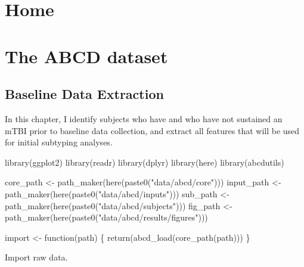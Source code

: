 \documentclass[
  letterpaper,
  DIV=11,
  numbers=noendperiod]{scrreprt}
\newenvironment{Shaded}{\begin{snugshade}}{\end{snugshade}}
\newcommand{\ControlFlowTok}[1]{\textcolor[rgb]{0.00,0.23,0.31}{#1}}
\newcommand{\FunctionTok}[1]{\textcolor[rgb]{0.28,0.35,0.67}{#1}}
\newcommand{\NormalTok}[1]{\textcolor[rgb]{0.00,0.23,0.31}{#1}}
\newcommand{\OtherTok}[1]{\textcolor[rgb]{0.00,0.23,0.31}{#1}}
\newcommand{\StringTok}[1]{\textcolor[rgb]{0.13,0.47,0.30}{#1}}
\begin{document}
\part{Home}

\part{The ABCD dataset}

\chapter{Baseline Data Extraction}\label{baseline-data-extraction}

In this chapter, I identify subjects who have and who have not sustained
an mTBI prior to baseline data collection, and extract all features that
will be used for initial subtyping analyses.

\begin{Shaded}
\begin{Highlighting}[]
\FunctionTok{library}\NormalTok{(ggplot2)}
\FunctionTok{library}\NormalTok{(readr)}
\FunctionTok{library}\NormalTok{(dplyr)}
\FunctionTok{library}\NormalTok{(here)}
\FunctionTok{library}\NormalTok{(abcdutils)}

\NormalTok{core\_path }\OtherTok{\textless{}{-}} \FunctionTok{path\_maker}\NormalTok{(}\FunctionTok{here}\NormalTok{(}\FunctionTok{paste0}\NormalTok{(}\StringTok{"data/abcd/core"}\NormalTok{)))}
\NormalTok{input\_path }\OtherTok{\textless{}{-}} \FunctionTok{path\_maker}\NormalTok{(}\FunctionTok{here}\NormalTok{(}\FunctionTok{paste0}\NormalTok{(}\StringTok{"data/abcd/inputs"}\NormalTok{)))}
\NormalTok{sub\_path }\OtherTok{\textless{}{-}} \FunctionTok{path\_maker}\NormalTok{(}\FunctionTok{here}\NormalTok{(}\FunctionTok{paste0}\NormalTok{(}\StringTok{"data/abcd/subjects"}\NormalTok{)))}
\NormalTok{fig\_path }\OtherTok{\textless{}{-}} \FunctionTok{path\_maker}\NormalTok{(}\FunctionTok{here}\NormalTok{(}\FunctionTok{paste0}\NormalTok{(}\StringTok{"data/abcd/results/figures"}\NormalTok{)))}

\NormalTok{import }\OtherTok{\textless{}{-}} \ControlFlowTok{function}\NormalTok{(path) \{}
    \FunctionTok{return}\NormalTok{(}\FunctionTok{abcd\_load}\NormalTok{(}\FunctionTok{core\_path}\NormalTok{(path)))}
\NormalTok{\}}
\end{Highlighting}
\end{Shaded}

Import raw data.
\end{document}
